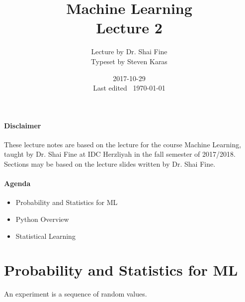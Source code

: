 \documentclass{idc_msc}
\title{Machine Learning\\\large Lecture 2}
\date{2017-10-29 \\ Last edited \currenttime\ \today}
\author{Lecture by Dr. Shai Fine\\Typeset by Steven Karas}
\begin{document}
\maketitle

\paragraph{Disclaimer}

These lecture notes are based on the lecture for the course Machine Learning, taught by Dr. Shai Fine at IDC Herzliyah in the fall semester of 2017/2018.
Sections may be based on the lecture slides written by Dr. Shai Fine.

\paragraph{Agenda}

\begin{itemize}
  \item Probability and Statistics for ML
  \item Python Overview
  \item Statistical Learning
\end{itemize}

\section{Probability and Statistics for ML}

An experiment is a sequence of random values.
\end{document}
